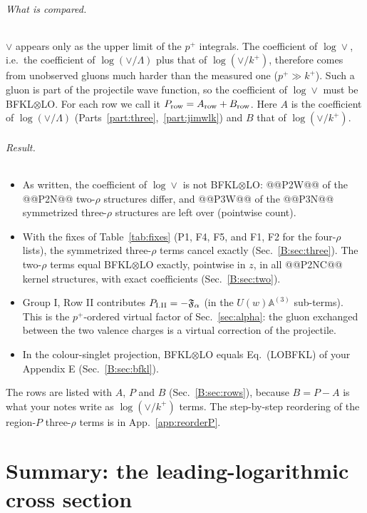\documentclass[10pt]{article}
\numberwithin{equation}{section}
\begin{document}
\paragraph{What is compared.} $\vee$ appears only as the upper limit of the $p^+$ integrals. The coefficient of $\log\vee$, i.e.\ the coefficient of $\log(\vee/\Lambda)$ plus that of $\log(\vee/k^+)$, therefore comes from unobserved gluons much harder than the measured one ($p^+\gg k^+$). Such a gluon is part of the projectile wave function, so the coefficient of $\log\vee$ must be BFKL$\otimes$LO. For each row we call it $P_{\rm row}=A_{\rm row}+B_{\rm row}$. Here $A$ is the coefficient of $\log(\vee/\Lambda)$ (Parts~\ref{part:three},~\ref{part:jimwlk}) and $B$ that of $\log(\vee/k^+)$.
\paragraph{Result.}
\begin{itemize}
\item As written, the coefficient of $\log\vee$ is not BFKL$\otimes$LO: @@P2W@@ of the @@P2N@@ two-$\rho$ structures differ, and @@P3W@@ of the @@P3N@@ symmetrized three-$\rho$ structures are left over (pointwise count).
\item With the fixes of Table~\ref{tab:fixes} (P1, F4, F5, and F1, F2 for the four-$\rho$ lists), the symmetrized three-$\rho$ terms cancel exactly (Sec.~\ref{B:sec:three}). The two-$\rho$ terms equal BFKL$\otimes$LO exactly, pointwise in $z$, in all @@P2NC@@ kernel structures, with exact coefficients (Sec.~\ref{B:sec:two}).
\item Group I, Row II contributes $P_{\rm I.II}=-\mathfrak F_\alpha$ (in the $U(w)\mathbb A^{(3)}$ sub-terms). This is the $p^+$-ordered virtual factor of Sec.~\ref{sec:alpha}: the gluon exchanged between the two valence charges is a virtual correction of the projectile.
\item In the colour-singlet projection, BFKL$\otimes$LO equals Eq.~(LOBFKL) of your Appendix E (Sec.~\ref{B:sec:bfkl}).
\end{itemize}
The rows are listed with $A$, $P$ and $B$ (Sec.~\ref{B:sec:rows}), because $B=P-A$ is what your notes write as $\log(\vee/k^+)$ terms. The step-by-step reordering of the region-$P$ three-$\rho$ terms is in App.~\ref{app:reorderP}.


\part{Summary: the leading-logarithmic cross section}\label{part:sum}
\end{document}
